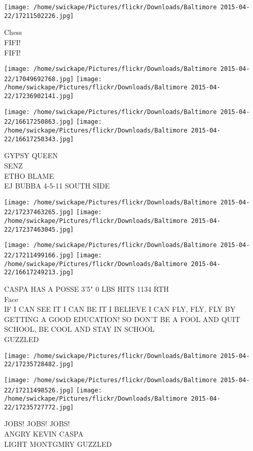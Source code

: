 \documentclass[10pt,letterpaper]{article}
\begin{document}
\vspace{0.25in}
\texttt{[image: /home/swickape/Pictures/flickr/Downloads/Baltimore 2015-04-22/17211502226.jpg]}

Chess\\
FIFI!\\
FIFI!
\pagebreak

\texttt{[image: /home/swickape/Pictures/flickr/Downloads/Baltimore 2015-04-22/17049692768.jpg]}
\texttt{[image: /home/swickape/Pictures/flickr/Downloads/Baltimore 2015-04-22/17236902141.jpg]}

\texttt{[image: /home/swickape/Pictures/flickr/Downloads/Baltimore 2015-04-22/16617250863.jpg]}
\texttt{[image: /home/swickape/Pictures/flickr/Downloads/Baltimore 2015-04-22/16617250343.jpg]}

GYPSY QUEEN\\
SENZ\\
ETHO BLAME\\
EJ BUBBA 4{-}5{-}11 SOUTH SIDE
\pagebreak

\texttt{[image: /home/swickape/Pictures/flickr/Downloads/Baltimore 2015-04-22/17237463265.jpg]}
\texttt{[image: /home/swickape/Pictures/flickr/Downloads/Baltimore 2015-04-22/17237463045.jpg]}

\texttt{[image: /home/swickape/Pictures/flickr/Downloads/Baltimore 2015-04-22/17211499166.jpg]}
\texttt{[image: /home/swickape/Pictures/flickr/Downloads/Baltimore 2015-04-22/16617249213.jpg]}

CASPA HAS A POSSE 3'5" 0 LBS HITS 1134 RTH\\
Face\\
IF I CAN SEE IT I CAN BE IT I BELIEVE I CAN FLY, FLY, FLY BY GETTING A GOOD EDUCATION!  SO DON'T BE A FOOL AND QUIT SCHOOL, BE COOL AND STAY IN SCHOOL\\
GUZZLED
\pagebreak

\texttt{[image: /home/swickape/Pictures/flickr/Downloads/Baltimore 2015-04-22/17235728482.jpg]}

\vspace{0.25in}
\texttt{[image: /home/swickape/Pictures/flickr/Downloads/Baltimore 2015-04-22/17211498526.jpg]}
\texttt{[image: /home/swickape/Pictures/flickr/Downloads/Baltimore 2015-04-22/17235727772.jpg]}

JOBS!  JOBS!  JOBS!\\
ANGRY KEVIN CASPA\\
LIGHT MONTGMRY GUZZLED
\pagebreak
\end{document}
